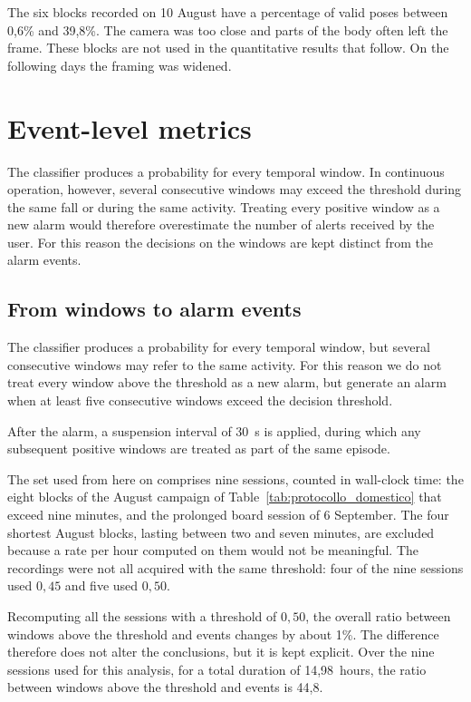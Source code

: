 The six blocks recorded on 10 August have a percentage of valid poses between 0,6\% and 39,8\%. The camera was too close and parts of the body often left the frame. These blocks are not used in the quantitative results that follow. On the following days the framing was widened.

\section{Event-level metrics}
\label{sec:falsi-allarmi}
\label{sec:finestre-eventi}

The classifier produces a probability for every temporal window. In continuous operation, however, several consecutive windows may exceed the threshold during the same fall or during the same activity. Treating every positive window as a new alarm would therefore overestimate the number of alerts received by the user. For this reason the decisions on the windows are kept distinct from the alarm events.

\subsection{From windows to alarm events}

The classifier produces a probability for every temporal window, but several consecutive windows may refer to the same activity. For this reason
we do not treat every window above the threshold as a new alarm, but
generate an alarm when at least five consecutive windows exceed the decision threshold.

After the alarm, a suspension interval of 30~s is applied, during which any subsequent positive windows are treated as part of the same episode.

The set used from here on comprises nine sessions, counted in wall-clock time: the eight blocks of the August campaign of Table~\ref{tab:protocollo_domestico} that exceed nine minutes, and the prolonged board session of 6 September. The four shortest August blocks, lasting between two and seven minutes, are excluded because a rate per hour computed on them would not be meaningful. The recordings were not all acquired with the same threshold: four of the nine sessions used $0{,}45$ and five used $0{,}50$.

Recomputing all the sessions with a threshold of $0{,}50$, the overall ratio between windows above the threshold and events changes by about 1\%. The difference therefore does not alter the conclusions, but it is kept explicit. Over the nine sessions used for this analysis, for a total duration of 14,98~hours, the ratio between windows above the threshold and events is 44,8.

